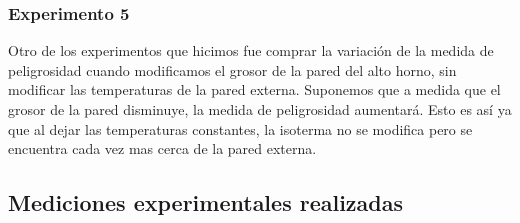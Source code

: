   	\subsubsection*{Experimento 5}
  		Otro de los experimentos que hicimos fue comprar la variación de la medida de peligrosidad cuando modificamos el grosor de la pared del alto horno, sin modificar las temperaturas de la pared externa.
		Suponemos que a medida que el grosor de la pared disminuye, la medida de peligrosidad aumentará. Esto es así ya que al dejar las temperaturas constantes, la isoterma no se modifica pero se encuentra cada vez mas cerca de la pared externa.


  \subsection{Mediciones experimentales realizadas}
